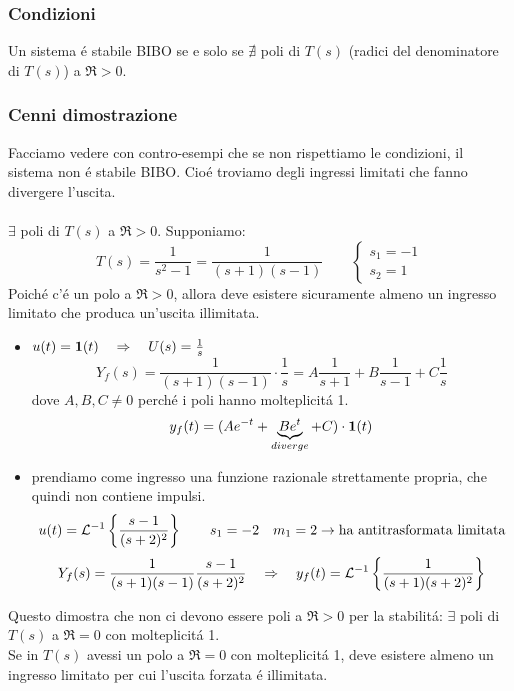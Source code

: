 \documentclass[../main.tex]{subfiles}
\begin{document}
	\subsubsection{Condizioni}
		Un sistema \'{e} stabile BIBO se e solo se $ \nexists $ poli di $ T(s) $ (radici del denominatore di $ T(s) $) a $ \Re > 0 $.
	
	\subsubsection{Cenni dimostrazione}
		Facciamo vedere con contro-esempi che se non rispettiamo le condizioni, il sistema non \'{e} stabile BIBO. Cio\'{e} troviamo degli ingressi limitati che fanno divergere l'uscita.\\
		\smallskip\\
		$ \exists $ poli di $ T(s) $ a $ \Re > 0 $. Supponiamo: 
		\[
			T(s) = \frac{1}{s^2-1} = \frac{1}{(s+1)(s-1)} \qquad
			\begin{cases}
				s_1 = -1
				\\
				s_2 = 1
			\end{cases}
		\]
		Poich\'{e} c'\'{e} un polo a $ \Re > 0 $, allora deve esistere sicuramente almeno un ingresso limitato che produca un'uscita illimitata.
		\begin{itemize}
			\item 
				$ u(t) = \textbf{1}(t) \quad \Rightarrow \quad U(s) = \frac{1}{s} $
				\[
					Y_f(s) = \frac{1}{(s+1)(s-1)} \cdot \frac{1}{s} = A\frac{1}{s+1}  + B\frac{1}{s-1} + C\frac{1}{s}
				\]
				dove $ A, B, C \neq 0 $ perch\'{e} i poli hanno molteplicit\'{a} 1.
				\[
					y_f(t) = (Ae^{-t} + \underbrace{Be^t}_{diverge} + C) \cdot \textbf{1}(t)
				\]
			\item
				prendiamo come ingresso una funzione razionale strettamente propria, che quindi non contiene impulsi.
				\[
					u(t) = \mathcal{L}^{-1} \left\lbrace \frac{s-1}{(s+2)^2} \right\rbrace \qquad s_1=-2 \quad m_1=2 \rightarrow \text{ha antitrasformata limitata}
				\]
				\[
					Y_f(s) = \frac{1}{(s+1)(s-1)} \frac{s-1}{(s+2)^2} \quad \Rightarrow \quad y_f(t) = \mathcal{L}^{-1} \left\lbrace \frac{1}{(s+1)(s+2)^2} \right\rbrace
				\]		
		\end{itemize}
		Questo dimostra che non ci devono essere poli a $ \Re > 0 $ per la stabilit\'{a}: $ \exists $ poli di $ T(s) $ a $ \Re = 0 $ con molteplicit\'{a} 1.\\
		\linebreak
		Se in $ T(s) $ avessi un polo a $ \Re = 0 $ con molteplicit\'{a} 1, deve esistere almeno un ingresso limitato per cui l'uscita forzata \'{e} illimitata.
\end{document}
